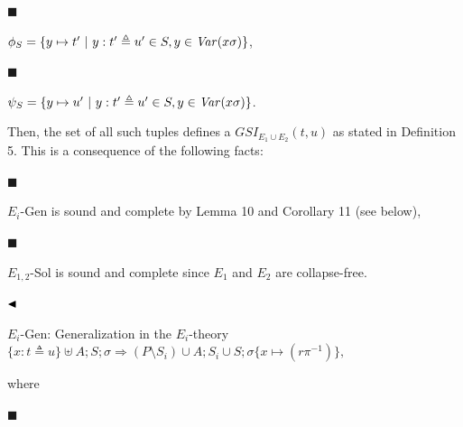 \documentclass[10pt,a4paper]{amsart}
\begin{document}
\par\noindent  $\blacksquare$ 
 
$\phi_{S}=\{y\mapsto t^{\prime}\leavevmode\nobreak\ |\leavevmode\nobreak\ y:t^{\prime}\triangleq u^{\prime}\in S,y\in\mathit{Var}(x\sigma)\}$,\par
 
 
 
\par\noindent  $\blacksquare$ 
 
$\psi_{S}=\{y\mapsto u^{\prime}\leavevmode\nobreak\ |\leavevmode\nobreak\ y:t^{\prime}\triangleq u^{\prime}\in S,y\in\mathit{Var}(x\sigma)\}$.\par
 
 
  
Then, the set of all such tuples defines a $GSI_{E_{1}\cup E_{2}}(t,u)$ as stated in Definition 5. This is a consequence of the following facts:\par
  
\par\noindent  $\blacksquare$ 
 
${E_{i}}$-Gen is sound and complete by Lemma 10 and Corollary 11 (see below),\par
 
 
 
\par\noindent  $\blacksquare$ 
 
$E_{1,2}$-Sol is sound and complete since $E_{1}$ and $E_{2}$ are collapse-free.\par
 
 
  
$\hfill\blacktriangleleft$\par
 

    
\par
 
$E_{i}$-Gen: Generalization in the $E_{i}$-theory  $\{x:t\triangleq u\}\uplus A;S;\sigma\Longrightarrow(P\setminus S_{i})\cup A;S_{i}\cup S;\sigma\{x\mapsto(r\pi^{-1})\},$\par
     
where\par
     
\par\noindent  $\blacksquare$ 
 
\end{document}

